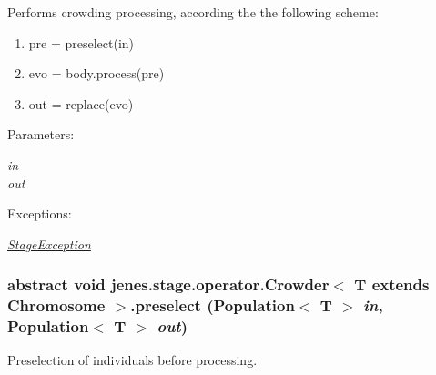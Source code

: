 Performs crowding processing, according the the following scheme: \begin{enumerate}
\item pre = preselect(in) \item evo = body.process(pre) \item out = replace(evo) \end{enumerate}
\begin{Desc}
\item[Parameters:]
\begin{description}
\item[{\em in}]\item[{\em out}]\end{description}
\end{Desc}
\begin{Desc}
\item[Exceptions:]
\begin{description}
\item[{\em \hyperlink{classjenes_1_1stage_1_1_stage_exception}{StageException}}]\end{description}
\end{Desc}
\hypertarget{classjenes_1_1stage_1_1operator_1_1_crowder_3_01_t_01extends_01_chromosome_01_4_e72da3620314eba33b17297eb6a52aa0}{
\subsubsection[preselect]{\setlength{\rightskip}{0pt plus 5cm}abstract void jenes.stage.operator.Crowder$<$ T extends Chromosome $>$.preselect (Population$<$ T $>$ {\em in}, \/  Population$<$ T $>$ {\em out})}}
\label{classjenes_1_1stage_1_1operator_1_1_crowder_3_01_t_01extends_01_chromosome_01_4_e72da3620314eba33b17297eb6a52aa0}


Preselection of individuals before processing.

